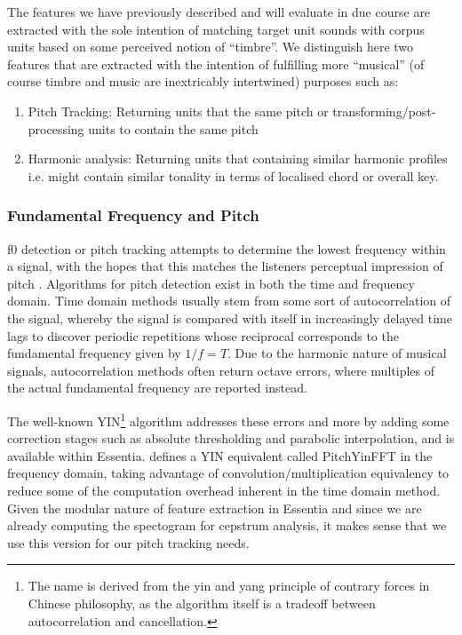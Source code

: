 {{{{The features we have previously described and will evaluate in due course are extracted with the sole intention of matching target unit sounds with corpus units based on some perceived notion of ``timbre''. We distinguish here two features that are extracted with the intention of fulfilling more ``musical'' (of course timbre and music are inextricably intertwined) purposes such as:

\begin{enumerate}
  \item Pitch Tracking: Returning units that the same pitch or transforming/post-processing units to contain the same pitch
  \item Harmonic analysis: Returning units that containing similar harmonic profiles i.e. might contain similar tonality in terms of localised chord or overall key.
\end{enumerate}


\subsubsection{Fundamental Frequency and Pitch}

\acrfull{f0} detection or pitch tracking attempts to determine the lowest frequency within a signal, with the hopes that this matches the listeners perceptual impression of pitch \citep{Gerhard2003}. Algorithms for pitch detection exist in both the time and frequency domain. Time domain methods usually stem from some sort of autocorrelation of the signal, whereby the signal is compared with itself in increasingly delayed time lags to discover periodic repetitions whose reciprocal corresponds to the fundamental frequency given by $1/f = T$. Due to the harmonic nature of musical signals, autocorrelation methods often return octave errors, where multiples of the actual fundamental frequency are reported instead.

The well-known YIN\footnote{The name is derived from the yin and yang principle of contrary forces in Chinese philosophy, as the algorithm itself is a tradeoff between autocorrelation and cancellation.} algorithm \citep{DeCheveigne2002} addresses these errors and more by adding some correction stages such as absolute thresholding and parabolic interpolation, and is available within Essentia. \cite{Brossier2006} defines a YIN equivalent called PitchYinFFT in the frequency domain, taking advantage of convolution/multiplication equivalency to reduce some of the computation overhead inherent in the time domain method. Given the modular nature of feature extraction in Essentia and since we are already computing the spectogram for cepstrum analysis, it makes sense that we use this version for our pitch tracking needs.

}}}}
